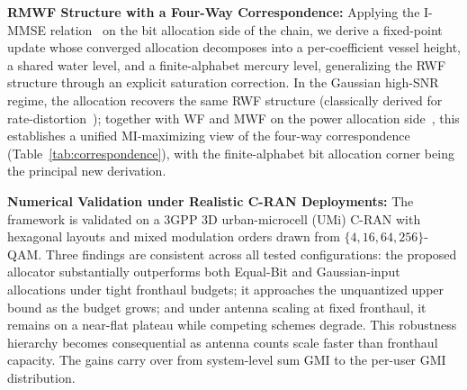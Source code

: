 \documentclass[10pt, twocolumn, comsoc]{IEEEtran}
\begin{document}
{\bf{RMWF Structure with a Four-Way Correspondence:}}
Applying the I-MMSE relation~\cite{GuoShamaiVerdu} on the bit allocation side of the chain, we derive a fixed-point update whose converged allocation decomposes into a per-coefficient vessel height, a shared water level, and a finite-alphabet mercury level, generalizing the RWF structure through an explicit saturation correction. 
In the Gaussian high-SNR regime, the allocation recovers the same RWF structure (classically derived for rate-distortion~\cite{CoverThomas}); together with WF and MWF on the power allocation side~\cite{LozanoTulinoVerdu}, this establishes a unified MI-maximizing view of the four-way correspondence (Table~\ref{tab:correspondence}), with the finite-alphabet bit allocation corner being the principal new derivation.

{\bf{Numerical Validation under Realistic C-RAN Deployments:}}
The framework is validated on a 3GPP 3D urban-microcell (UMi) C-RAN with hexagonal layouts and mixed modulation orders drawn from $\{4,16,64,256\}$-QAM. Three findings are consistent across all tested configurations: the proposed allocator substantially outperforms both Equal-Bit and Gaussian-input allocations under tight fronthaul budgets; it approaches the unquantized upper bound as the budget grows; and under antenna scaling at fixed fronthaul, it remains on a near-flat plateau while competing schemes degrade. This robustness hierarchy becomes consequential as antenna counts scale faster than fronthaul capacity. The gains carry over from system-level sum GMI to the per-user GMI distribution.
\end{document}
